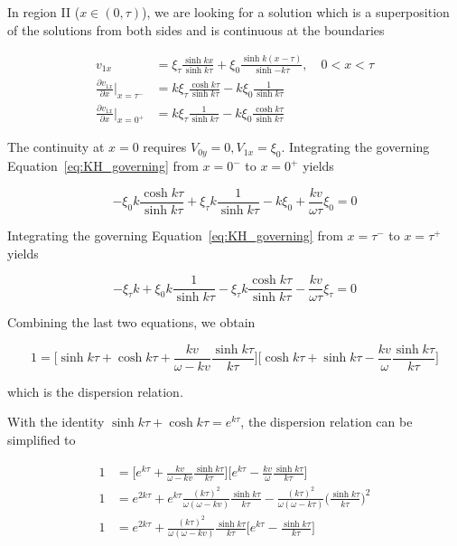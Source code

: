 \documentclass[
  notoc %
]{tufte-book}
\begin{document}
In region II (\(x\in(0,\tau)\)), we are looking for a solution which is
a superposition of the solutions from both sides and is continuous at
the boundaries

\[
\begin{aligned}
v_{1x} &=\xi_\tau \frac{\sinh{kx}}{\sinh{k\tau}} + \xi_0\frac{\sinh{k(x-\tau)}}{\sinh{-k\tau}},\quad 0<x<\tau \\
\frac{\partial v_{1x}}{\partial x}\big|_{x=\tau^-} &= k\xi_\tau \frac{\cosh{k\tau}}{\sinh{k\tau}} - k\xi_0\frac{1}{\sinh{k\tau}} \\
 \frac{\partial v_{1x}}{\partial x}\big|_{x=0^+} &= k\xi_\tau \frac{1}{\sinh{k\tau}} - k\xi_0\frac{\cosh{k\tau}}{\sinh{k\tau}}
\end{aligned}
\]

The continuity at \(x = 0\) requires \(V_{0y}=0, V_{1x}=\xi_0\).
Integrating the governing Equation~\ref{eq:KH_governing} from \(x=0^-\)
to \(x=0^+\) yields

\[
-\xi_0 k\frac{\cosh{k\tau}}{\sinh{k\tau}} + \xi_\tau k\frac{1}{\sinh{k\tau}} - k\xi_0 + \frac{kv}{\omega\tau}\xi_0 = 0
\]

Integrating the governing Equation~\ref{eq:KH_governing} from
\(x=\tau^-\) to \(x=\tau^+\) yields

\[
-\xi_\tau k +\xi_0 k\frac{1}{\sinh{k\tau}} - \xi_\tau k\frac{\cosh{k\tau}}{\sinh{k\tau}} - \frac{kv}{\omega\tau}\xi_\tau = 0
\]

Combining the last two equations, we obtain

\[
1 = \Big[ \sinh{k\tau} + \cosh{k\tau} + \frac{kv}{\omega-kv}\frac{\sinh{k\tau}}{k\tau}\Big] \Big[ \cosh{k\tau}+\sinh{k\tau} - \frac{kv}{\omega}\frac{\sinh{k\tau}}{k\tau}\Big]
\]

which is the dispersion relation.

With the identity \(\sinh{k\tau} + \cosh{k\tau} = e^{k\tau}\), the
dispersion relation can be simplified to

\[
\begin{aligned}
1 &= \Big[ e^{k\tau} + \frac{kv}{\omega-kv}\frac{\sinh{k\tau}}{k\tau}\Big] \Big[ e^{k\tau} - \frac{kv}{\omega}\frac{\sinh{k\tau}}{k\tau}\Big] \\
1 &= e^{2k\tau} +e^{k\tau}\frac{(k\tau)^2}{\omega(\omega-kv)}\frac{\sinh{k\tau}}{k\tau} - \frac{(k\tau)^2}{\omega(\omega-k\tau)}\Big(\frac{\sinh{k\tau}}{k\tau}\Big)^2 \\
1 &= e^{2k\tau} + \frac{(k\tau)^2}{\omega(\omega-kv)} \frac{\sinh{k\tau}}{k\tau} \Big[ e^{k\tau} - \frac{\sinh{k\tau}}{k\tau}\Big]
\end{aligned}
\]
\end{document}
